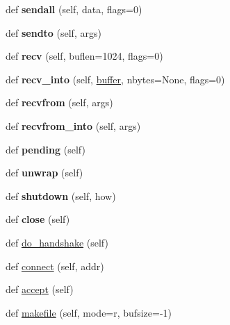 \begin{DoxyCompactItemize}
def {\bfseries sendall} (self, data, flags=0)
\item 
\mbox{\label{classgevent_1_1__ssl2_1_1_s_s_l_socket_a5624fc4277989a9b103f957b5c7033e8}} 
def {\bfseries sendto} (self, args)
\item 
\mbox{\label{classgevent_1_1__ssl2_1_1_s_s_l_socket_aa01c690a4f3d242f4f07a0dc6b1309fa}} 
def {\bfseries recv} (self, buflen=1024, flags=0)
\item 
\mbox{\label{classgevent_1_1__ssl2_1_1_s_s_l_socket_ae834a4f3d61681bd9c4ca59a1e7fb6c5}} 
def {\bfseries recv\+\_\+into} (self, \hyperlink{structbuffer}{buffer}, nbytes=None, flags=0)
\item 
\mbox{\label{classgevent_1_1__ssl2_1_1_s_s_l_socket_a024df28944759b69a95eed5b15cea4e2}} 
def {\bfseries recvfrom} (self, args)
\item 
\mbox{\label{classgevent_1_1__ssl2_1_1_s_s_l_socket_a5d9d616b1ce44d669d55fc377516c4c1}} 
def {\bfseries recvfrom\+\_\+into} (self, args)
\item 
\mbox{\label{classgevent_1_1__ssl2_1_1_s_s_l_socket_a6090244967e1ad8513425cecd581723f}} 
def {\bfseries pending} (self)
\item 
\mbox{\label{classgevent_1_1__ssl2_1_1_s_s_l_socket_ae452f2a2a29c5abb17c1ae8d68647737}} 
def {\bfseries unwrap} (self)
\item 
\mbox{\label{classgevent_1_1__ssl2_1_1_s_s_l_socket_af78582bd0abc9caecbefae1160dabbf8}} 
def {\bfseries shutdown} (self, how)
\item 
\mbox{\label{classgevent_1_1__ssl2_1_1_s_s_l_socket_a30a2b1ffe487d4a77356f5bceb8f162f}} 
def {\bfseries close} (self)
\item 
def \hyperlink{classgevent_1_1__ssl2_1_1_s_s_l_socket_a43730cc2ec5f130dc6e1ebd8aeb77426}{do\+\_\+handshake} (self)
\item 
def \hyperlink{classgevent_1_1__ssl2_1_1_s_s_l_socket_a244abd0b9d1c7d23a9695c2c7f2e0d32}{connect} (self, addr)
\item 
def \hyperlink{classgevent_1_1__ssl2_1_1_s_s_l_socket_accf322eecb3305a7743613dd6c3f9fa5}{accept} (self)
\item 
def \hyperlink{classgevent_1_1__ssl2_1_1_s_s_l_socket_afbb485141d0319326f358c63e17ab8f8}{makefile} (self, mode=\textquotesingle{}r\textquotesingle{}, bufsize=-\/1)
\end{DoxyCompactItemize}
